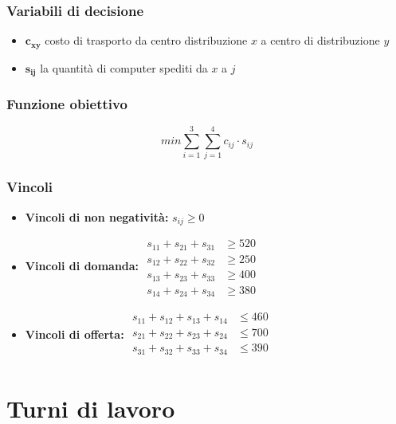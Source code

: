 \subsubsection{Variabili di decisione}
\begin{itemize}
    \item $\mathbf{c_{xy}}$ costo di trasporto da centro distribuzione $x$ a centro di distribuzione $y$
    \item $\mathbf{s_{ij}}$ la quantità di computer spediti da $x$ a $j$
\end{itemize}


\subsubsection{Funzione obiettivo}
{
    \Large
    $$
    min \sum_{i=1}^{3} \sum_{j=1}^{4} c_{ij} \cdot s_{ij}
    $$
}


\subsubsection{Vincoli}
\begin{itemize}
    \item \textbf{Vincoli di non negatività:} $s_{ij} \geq 0$
    \item \textbf{Vincoli di domanda:} 
    $
        \begin{aligned}
            s_{11} + s_{21} + s_{31}  &\geq   520 \\ 
            s_{12} + s_{22} + s_{32}  &\geq   250 \\ 
            s_{13} + s_{23} + s_{33}  &\geq   400 \\
            s_{14} + s_{24} + s_{34}  &\geq   380
        \end{aligned}
    $

    \item \textbf{Vincoli di offerta:}
    $
        \begin{aligned}
            s_{11} + s_{12} + s_{13} + s_{14}  &\leq   460  \\
            s_{21} + s_{22} + s_{23} + s_{24}  &\leq   700  \\
            s_{31} + s_{32} + s_{33} + s_{34}  &\leq   390  \\
        \end{aligned}
    $
\end{itemize}

\newpage
\section{Turni di lavoro}
